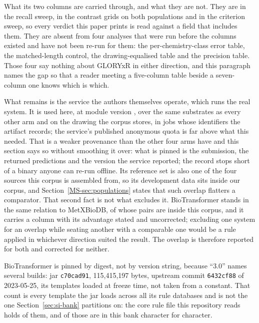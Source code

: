 \documentclass[journal=jcisd8,manuscript=suppinfo,layout=onecolumn]{achemso}
\begin{document}
What its two columns are carried through, and what they are not. They are in the recall sweep, in
the contrast grids on both populations and in the criterion sweep, so every verdict this paper
prints is read against a field that includes them. They are absent from four analyses that were
run before the columns existed and have not been re-run for them: the per-chemistry-class error
table, the matched-length control, the drawing-equalised table and the precision table. Those four
say nothing about GLORYxR in either direction, and this paragraph names the gap so that a reader
meeting a five-column table beside a seven-column one knows which is which.

What remains is the service the authors themselves operate, which runs the real system. It is used
here, at module version \numComparatorsGloryxarmVersion{}, over the same
\numPopulationN{} substrates as every other arm and on the drawing the corpus stores, in
\numGxarmJobsWord{} jobs whose identifiers the artifact records; the service's published anonymous
quota is far above what this needed. That is a weaker provenance than the other four arms have and
this section says so without smoothing it over: what is pinned is the submission, the returned
predictions and the version the service reported; the record stops short of a binary anyone can
re-run offline.
Its reference set is also one of the four sources this corpus is assembled from, so its
development data sits inside our corpus, and Section~\ref{MS-sec:populations} states that such
overlap flatters a comparator. That second fact is not what excludes it. BioTransformer stands in
the same relation to MetXBioDB, \numAssemblyMetxsharePct{} of whose pairs are inside this
corpus, and it carries a column with its advantage stated and uncorrected; excluding one system
for an overlap while seating another with a comparable one would be a rule applied in whichever
direction suited the result. The overlap is therefore reported for both and corrected for
neither.

BioTransformer is pinned by digest, not by version string, because ``3.0'' names several
builds: jar \texttt{c70cad91}, 115{,}415{,}197 bytes, upstream commit \texttt{6432cf88} of
2023-05-25, its \numBtTemplates{} templates loaded at freeze time, not taken from a
constant. That count is every template the jar loads across all its rule databases and is not the
one Section~\ref{sec:si-bank} partitions on: the core rule file this repository reads holds
\numThirdpartyBiotransformerRead{} of them, and \numThirdpartyBiotransformerShipped{} of those
are in this bank character for character.
\end{document}

